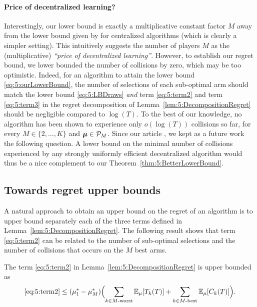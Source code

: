 \paragraph{Price of decentralized learning?}
%
Interestingly, our lower bound is exactly a multiplicative constant factor $M$ away from the lower bound given by \cite{Anantharam87a} for centralized algorithms (which is clearly a simpler setting). This intuitively suggests the number of players $M$ as the (multiplicative) \emph{``price of decentralized learning''}. However, to establish our regret bound, we lower bounded the number of collisions by zero, which may be too optimistic.
%
Indeed, for an algorithm to attain the lower bound \eqref{eq:5:ourLowerBound}, the number of selections of each sub-optimal arm should match the lower bound \eqref{eq:5:LBDraws} \emph{and} term \ref{eq:5:term2} and term \ref{eq:5:term3} in the regret decomposition of Lemma~\ref{lem:5:DecompositionRegret} should be negligible compared to  $\log(T)$.
To the best of our knowledge, no algorithm has been shown to experience only $o(\log(T))$ collisions so far,
for every $M \in \{2,\dots,K\}$ and $\boldsymbol{\mu} \in \mathcal{P}_M$.
%
Since our article \cite{Besson2018ALT}, we kept as a future work the following question.
A lower bound on the minimal number of collisions experienced by any strongly uniformly efficient decentralized algorithm would thus be a nice complement to our Theorem~\ref{thm:5:BetterLowerBound}.


\subsection{Towards regret upper bounds}
\label{sub:5:towardsRegretUpperBounds}

A natural approach to obtain an upper bound on the regret of an algorithm is to upper bound separately each of the three terms defined in Lemma~\ref{lem:5:DecompositionRegret}.
The following result shows that term \ref{eq:5:term2} can be related to the number of sub-optimal selections and the number of collisions that occurs on the $M$ best arms.

\begin{lemma}\label{lem:5:1stUpperBound}
  The term \ref{eq:5:term2} in Lemma~\ref{lem:5:DecompositionRegret} is upper bounded as
  \begin{equation}\label{eq:5:1stUpperBound}
    \ref{eq:5:term2} \leq (\mu_1^* - \mu_M^*) \Bigl(    \sum_{k \in M\text{-}\mathrm{worst}} \mathbb{E}_{\mu}[T_k(T)]
    + \sum_{k \in M\text{-}\mathrm{best}} \mathbb{E}_{\mu}[C_{k}(T)]
    \Bigr).
  \end{equation}
\end{lemma}

